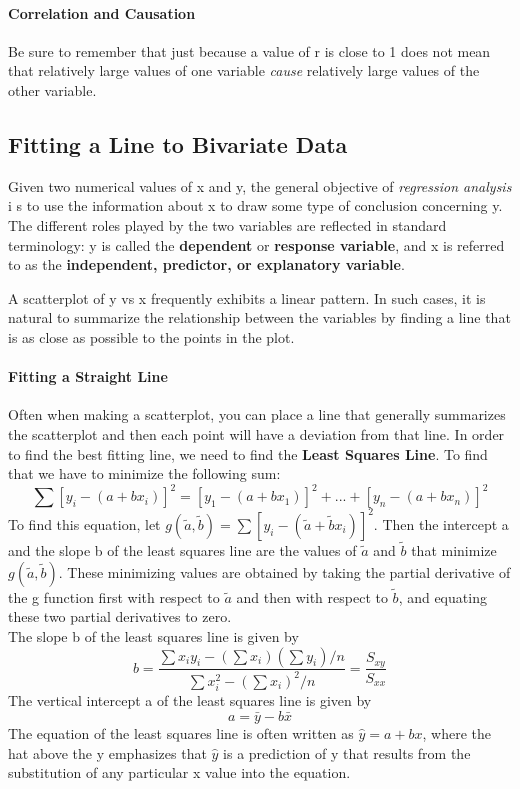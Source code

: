 \documentclass{article}
\newcommand{\p}[1]{\paragraph{#1}} %
\begin{document}
	\p{Correlation and Causation}
		Be sure to remember that just because a value of r is close to 1 does not mean that 
		relatively large values of one variable \textit{cause} relatively large values of the other 
		variable.
	
	\subsection{Fitting a Line to Bivariate Data} %
	Given two numerical values of x and y, the general objective of \textit{regression analysis} i
	s to use the information about x to draw some type of conclusion concerning y. The 
	different roles played by the two variables are reflected in standard terminology: y is called 
	the \textbf{dependent} or \textbf{response variable}, and x is referred to as the 
	\textbf{independent, predictor, or explanatory variable}. 
		
	A scatterplot of y vs x frequently exhibits a linear pattern. In such cases, it is natural to 
	summarize the relationship between the variables by finding a line that is as close as 
	possible to the points in the plot.
		
	\p{Fitting a Straight Line} Often when making a scatterplot, you can place a line 
		that generally summarizes the scatterplot and then each point will have a deviation from 
		that line. In order to find the best fitting line, we need to find the \textbf{Least Squares 
		Line}. To find that we have to minimize the following sum:
		\[ \sum[y_i-(a+bx_i)]^2 = [y_1-(a+bx_1)]^2+...+[y_n-(a+bx_n)]^2 \]
		To find this equation, let $g(\tilde{a},\tilde{b}) = \sum[y_i - (\tilde{a}+
		\tilde{b}x_i)]^2$. Then the intercept a and the slope b of the least squares line are the 
		values of $\tilde{a}$ and $\tilde{b}$ that minimize $g(\tilde{a},\tilde{b})$. 
		These minimizing values are obtained by taking the partial derivative of the g function first 
		with respect to $\tilde{a}$ and then with respect to $\tilde{b}$, and equating these 
		two partial derivatives to zero. \\
		
		The slope b of the least squares line is given by
		\[ b = \frac{\sum x_iy_i - \left(\sum x_i\right)\left(\sum y_i\right) / n}{\sum x_i^2 - \left(\sum 
		x_i\right)^2 / n} = \frac{S_{xy}}{S_{xx}} \]
		The vertical intercept a of the least squares line is given by
		\[ a = \bar{y} - b\bar{x} \]
		The equation of the least squares line is often written as $\hat{y} = a + bx$, where the hat 
		above the y emphasizes that $\hat{y}$ is a prediction of y that results from the substitution 
		of any particular x value into the equation.
		
\end{document}
